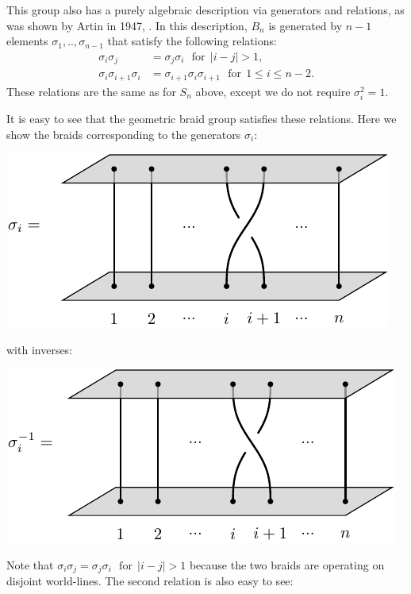 This group also has a purely algebraic description via
generators and relations, as was shown by Artin in 1947, \cite{Artin1947,Birman1974}.
In this description, 
$B_n$ is generated by $n-1$ elements $\sigma_1,..,\sigma_{n-1}$ that satisfy
the following relations:
\begin{align*}
    \sigma_i \sigma_j &= \sigma_j \sigma_i \ \ \ \mbox{for}\ \ |i-j|>1,\\
    \sigma_i \sigma_{i+1} \sigma_i &= \sigma_{i+1} \sigma_i \sigma_{i+1} \ \ \ \mbox{for}\ \ 1\le i \le n-2.
\end{align*}
These relations are the same as for $S_n$ above, except 
we do not require $\sigma_i^2 = 1.$

It is easy to see that the geometric braid group satisfies these
relations. Here we show the braids corresponding to the generators $\sigma_i:$
\begin{center}
\includegraphics[]{pic-braid-sigma-0.pdf}
\end{center}
with inverses:
\begin{center}
\includegraphics[]{pic-braid-sigma-1.pdf}
\end{center}
Note that 
$\sigma_i \sigma_j = \sigma_j \sigma_i \ \ \ \mbox{for}\ \ |i-j|>1$
because the two braids are operating on disjoint world-lines.
The second relation is also easy to see:

